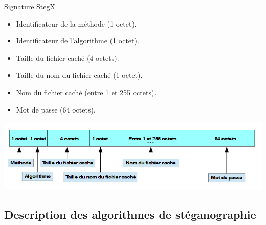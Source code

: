 \documentclass{beamer}
\begin{document}
  \begin{frame}
  
  \begin{block}{Signature StegX}
	\begin{itemize}
	[circle]
	\item Identificateur de la méthode (1 octet).
	\item Identificateur de l'algorithme (1 octet). 
	\item Taille du fichier caché (4 octets). 
	\item Taille du nom du fichier caché (1 octet). 
	\item Nom du fichier caché (entre 1 et 255 octets). 
	\item Mot de passe (64 octets).  
	\end{itemize}
	\end{block}
  
  \includegraphics[scale=0.55]{pictures/signature_6.png}
  \end{frame}

  \subsection{Description des algorithmes de stéganographie} %
  
\end{document}
